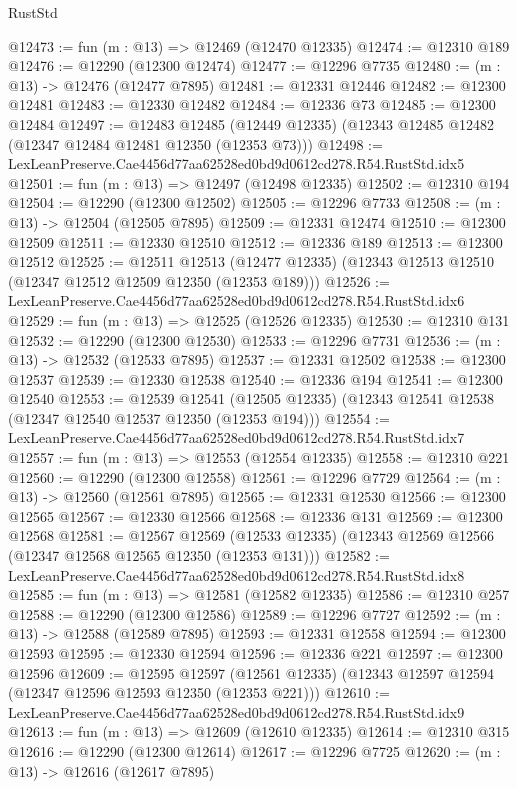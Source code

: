 \begin{lexlean}{RustStd}
\begin{coremodule}
@12473 := fun (m : @13) => @12469 (@12470 @12335)
@12474 := @12310 @189
@12476 := @12290 (@12300 @12474)
@12477 := @12296 @7735
@12480 := (m : @13) -> @12476 (@12477 @7895)
@12481 := @12331 @12446
@12482 := @12300 @12481
@12483 := @12330 @12482
@12484 := @12336 @73
@12485 := @12300 @12484
@12497 := @12483
    @12485
    (@12449 @12335)
    (@12343 @12485 @12482 (@12347 @12484 @12481 @12350 (@12353 @73)))
@12498 := LexLeanPreserve.Cae4456d77aa62528ed0bd9d0612cd278.R54.RustStd.idx5
@12501 := fun (m : @13) => @12497 (@12498 @12335)
@12502 := @12310 @194
@12504 := @12290 (@12300 @12502)
@12505 := @12296 @7733
@12508 := (m : @13) -> @12504 (@12505 @7895)
@12509 := @12331 @12474
@12510 := @12300 @12509
@12511 := @12330 @12510
@12512 := @12336 @189
@12513 := @12300 @12512
@12525 := @12511
    @12513
    (@12477 @12335)
    (@12343 @12513 @12510 (@12347 @12512 @12509 @12350 (@12353 @189)))
@12526 := LexLeanPreserve.Cae4456d77aa62528ed0bd9d0612cd278.R54.RustStd.idx6
@12529 := fun (m : @13) => @12525 (@12526 @12335)
@12530 := @12310 @131
@12532 := @12290 (@12300 @12530)
@12533 := @12296 @7731
@12536 := (m : @13) -> @12532 (@12533 @7895)
@12537 := @12331 @12502
@12538 := @12300 @12537
@12539 := @12330 @12538
@12540 := @12336 @194
@12541 := @12300 @12540
@12553 := @12539
    @12541
    (@12505 @12335)
    (@12343 @12541 @12538 (@12347 @12540 @12537 @12350 (@12353 @194)))
@12554 := LexLeanPreserve.Cae4456d77aa62528ed0bd9d0612cd278.R54.RustStd.idx7
@12557 := fun (m : @13) => @12553 (@12554 @12335)
@12558 := @12310 @221
@12560 := @12290 (@12300 @12558)
@12561 := @12296 @7729
@12564 := (m : @13) -> @12560 (@12561 @7895)
@12565 := @12331 @12530
@12566 := @12300 @12565
@12567 := @12330 @12566
@12568 := @12336 @131
@12569 := @12300 @12568
@12581 := @12567
    @12569
    (@12533 @12335)
    (@12343 @12569 @12566 (@12347 @12568 @12565 @12350 (@12353 @131)))
@12582 := LexLeanPreserve.Cae4456d77aa62528ed0bd9d0612cd278.R54.RustStd.idx8
@12585 := fun (m : @13) => @12581 (@12582 @12335)
@12586 := @12310 @257
@12588 := @12290 (@12300 @12586)
@12589 := @12296 @7727
@12592 := (m : @13) -> @12588 (@12589 @7895)
@12593 := @12331 @12558
@12594 := @12300 @12593
@12595 := @12330 @12594
@12596 := @12336 @221
@12597 := @12300 @12596
@12609 := @12595
    @12597
    (@12561 @12335)
    (@12343 @12597 @12594 (@12347 @12596 @12593 @12350 (@12353 @221)))
@12610 := LexLeanPreserve.Cae4456d77aa62528ed0bd9d0612cd278.R54.RustStd.idx9
@12613 := fun (m : @13) => @12609 (@12610 @12335)
@12614 := @12310 @315
@12616 := @12290 (@12300 @12614)
@12617 := @12296 @7725
@12620 := (m : @13) -> @12616 (@12617 @7895)

\end{coremodule}
\end{lexlean}
